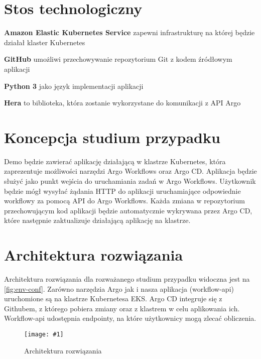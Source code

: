 \documentclass{article}
\newcommand{\img}[4]{
    \begin{figure}[!htbp]
    \centering
    \texttt{[image: \#1]}
    \caption{#2}
    \label{#3}
    \end{figure}
}
\begin{document}
\section{Stos technologiczny}
\begin{description}
\item{\textbf{Amazon Elastic Kubernetes Service}\cite{aws-eks}} zapewni infrastrukturę na której będzie działał klaster Kubernetes

\item{\textbf{GitHub}\cite{github}} umożliwi przechowywanie repozytorium Git z kodem źródłowym aplikacji

\item{\textbf{Python 3}\cite{python}} jako język implementacji aplikacji

\item{\textbf{Hera}\cite{hera}} to biblioteka, która zostanie wykorzystane do komunikacji z API Argo
\end{description}


\section{Koncepcja studium przypadku}
Demo będzie zawierać aplikację działającą w klastrze Kubernetes, która zaprezentuje możliwości narzędzi Argo Workflows oraz Argo CD. 
Aplikacja będzie służyć jako punkt wejścia do uruchamiania zadań w Argo Workflows. 
Użytkownik będzie mógł wysyłać żądania HTTP do aplikacji uruchamiające odpowiednie workflowy za pomocą API do Argo Workflows. 
Każda zmiana w repozytorium przechowującym kod aplikacji będzie automatycznie wykrywana przez Argo CD, które następnie zaktualizuje działającą aplikację na klastrze.


\section{Architektura rozwiązania}
Architektura rozwiązania dla rozważanego studium przypadku widoczna jest na \autoref{fig:env-conf}. Zarówno narzędzia Argo jak i nasza aplikacja (workflow-api) uruchomione są na klastrze Kubernetesa EKS. Argo CD integruje się z Githubem, z którego pobiera zmiany oraz z klastrem w celu aplikowania ich. Workflow-api udostępnia endpointy, na które użytkownicy mogą zlecać obliczenia.

\img{img/suu_env_conf.drawio.png}{Architektura rozwiązania}{fig:env-conf}{0.9}
\end{document}
